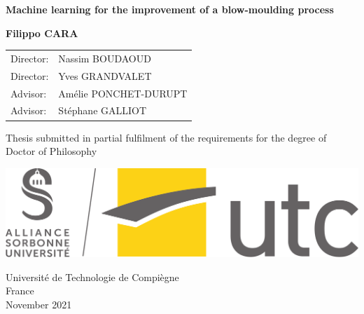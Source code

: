 \begin{titlepage}
    \begin{center}
        
        \Huge
        \textbf{Machine learning for the improvement of a blow-moulding process}
            
        \vspace{1cm}
        
        \Large  
        \textbf{Filippo CARA}
        \vspace{1cm}
        
        \large
        \begin{tabular}{ll}
            Director: & Nassim BOUDAOUD \tabularnewline
            Director: & Yves GRANDVALET \tabularnewline
            Advisor: & Amélie PONCHET-DURUPT \tabularnewline
            Advisor: & Stéphane GALLIOT \tabularnewline
        \end{tabular}
    
        \vspace*{1.5cm}
        
        \Large     
        Thesis submitted in partial fulfilment of the requirements
        for the degree of\\
        Doctor of Philosophy
        
        \vspace{1cm}
        \includegraphics[scale=0.1]{images/UTC_logo.png}
        \vspace{0.8cm}
            
        \large
        Université de Technologie de Compiègne\\
        France\\
        November 2021
    \end{center}
\end{titlepage}